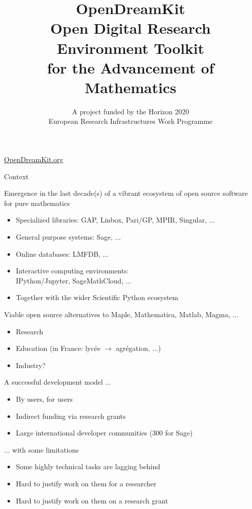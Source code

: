 \documentclass[
  usenames,svgnames, %
  compress,
  ]{beamer}
\title{{\huge \color{red} OpenDreamKit}\\
  Open Digital Research Environment Toolkit\\
  for the Advancement of Mathematics\\}
\subtitle{A project funded by the Horizon 2020\\
  European Research Infrastructures Work Programme}
\begin{document}
\begin{frame}
  \maketitle

  \Huge
  \centerline{\url{OpenDreamKit.org}}
\end{frame}


\begin{frame}{Context}
  \begin{block}{Emergence in the last decade(s) of a vibrant ecosystem
      of open source software for pure mathematics}

    \begin{itemize}
    \item Specialized libraries: GAP, Linbox, Pari/GP, MPIR, Singular,
      ...
    \item General purpose systems: Sage, ...
    \item Online databases: LMFDB, ...
    \item Interactive computing environments:\\
      IPython/Jupyter, SageMathCloud, ...
    \item Together with the wider Scientific Python ecosystem
    \end{itemize}
  \end{block}
  \bigskip

  \begin{block}{Viable open source alternatives to Maple, Mathematica,
      Matlab, Magma, ...}
    \begin{itemize}
    \item Research
    \item Education (in France: lycée $\longrightarrow$ agrégation, ...)
    \item Industry?
    \end{itemize}
  \end{block}
\end{frame}


\begin{frame}
  \begin{block}{A successful development model ...}
    \begin{itemize}
    \item By users, for users
    \item Indirect funding via research grants
    \item Large international developer communities (300 for Sage)
    \end{itemize}
  \end{block}

  \begin{block}{... with some limitations}
    \begin{itemize}
    \item Some highly technical tasks are lagging behind
    \item Hard to justify work on them for a researcher
    \item Hard to justify work on them on a research grant
    \end{itemize}
  \end{block}
\end{frame}
\end{document}
